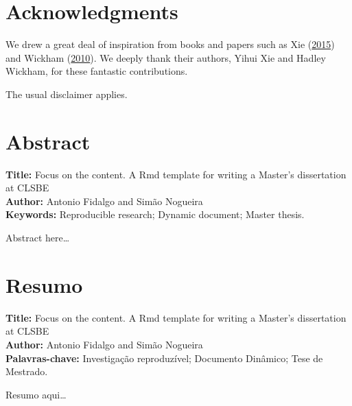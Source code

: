 \documentclass[
  12pt,
]{article}
\begin{document}
\clearpage
{}

\hypertarget{acknowledgments}{%
\section*{Acknowledgments}\label{acknowledgments}}

We drew a great deal of inspiration from books and papers such as Xie (\protect\hyperlink{ref-Xie_2015}{2015}) and Wickham (\protect\hyperlink{ref-Wickham_2010}{2010}). We deeply thank their authors, Yihui Xie and Hadley Wickham, for these fantastic contributions.

The usual disclaimer applies.

\clearpage

\hypertarget{abstract}{%
\section*{Abstract}\label{abstract}}

\textbf{Title:} Focus on the content. A Rmd template for writing a Master's dissertation at CLSBE\\
\textbf{Author:} Antonio Fidalgo and Simão Nogueira\\
\textbf{Keywords:} Reproducible research; Dynamic document; Master thesis.

\vspace{3\baselineskip}

Abstract here\ldots{}

\clearpage

\hypertarget{resumo}{%
\section*{Resumo}\label{resumo}}

\textbf{Title:} Focus on the content. A Rmd template for writing a Master's dissertation at CLSBE\\
\textbf{Author:} Antonio Fidalgo and Simão Nogueira\\
\textbf{Palavras-chave:} Investigação reproduzível; Documento Dinâmico; Tese de Mestrado.

\vspace{3\baselineskip}

Resumo aqui\ldots{}

\clearpage\tableofcontents
\clearpage\listoffigures
\clearpage\listoftables
\end{document}
